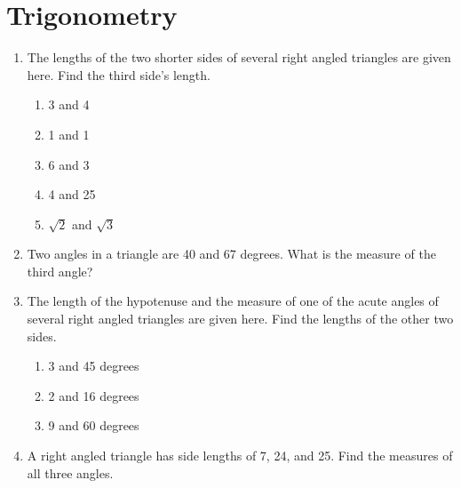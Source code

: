 \documentclass{amsbook}
\begin{document}
\section{Trigonometry}
\begin{enumerate}
  \item The lengths of the two shorter sides of several right angled triangles are given here. Find the third side's length.
    \begin{enumerate}
      \item 3 and 4
      \item 1 and 1
      \item 6 and 3
      \item 4 and 25
      \item $\sqrt{2}$ and $ \sqrt{3} $
    \end{enumerate}
  \item Two angles in a triangle are 40 and 67 degrees. What is the measure of the third angle?
  \item The length of the hypotenuse and the measure of one of the acute angles of several right angled triangles
        are given here. Find the lengths of the other two sides.
    \begin{enumerate}
      \item 3 and 45 degrees
      \item 2 and 16 degrees
      \item 9 and 60 degrees
    \end{enumerate}
  \item A right angled triangle has side lengths of 7, 24, and 25. Find the measures of all three angles.
\end{enumerate}
\end{document}

